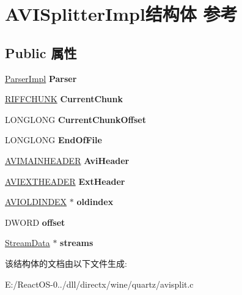 \hypertarget{struct_a_v_i_splitter_impl}{}\section{A\+V\+I\+Splitter\+Impl结构体 参考}
\label{struct_a_v_i_splitter_impl}
\subsection*{Public 属性}
\begin{DoxyCompactItemize}
\item 
\mbox{\label{struct_a_v_i_splitter_impl_aa3b6ea1031540ad750081ae0b09b90b2}} 
\hyperlink{struct_parser_impl}{Parser\+Impl} {\bfseries Parser}
\item 
\mbox{\label{struct_a_v_i_splitter_impl_ad8084f23fe123de1a71cac94f5cab819}} 
\hyperlink{struct__riffchunk}{R\+I\+F\+F\+C\+H\+U\+NK} {\bfseries Current\+Chunk}
\item 
\mbox{\label{struct_a_v_i_splitter_impl_aacb860ceb3227ba58abe3f0c29e6408e}} 
L\+O\+N\+G\+L\+O\+NG {\bfseries Current\+Chunk\+Offset}
\item 
\mbox{\label{struct_a_v_i_splitter_impl_a7548da62793dfd151c9e2f19b0f82760}} 
L\+O\+N\+G\+L\+O\+NG {\bfseries End\+Of\+File}
\item 
\mbox{\label{struct_a_v_i_splitter_impl_a7946f7e1cdebabab5d89bc9ddba5016e}} 
\hyperlink{struct__avimainheader}{A\+V\+I\+M\+A\+I\+N\+H\+E\+A\+D\+ER} {\bfseries Avi\+Header}
\item 
\mbox{\label{struct_a_v_i_splitter_impl_a0e593c99255298d9aac1a09d7e2d3e9b}} 
\hyperlink{struct__aviextheader}{A\+V\+I\+E\+X\+T\+H\+E\+A\+D\+ER} {\bfseries Ext\+Header}
\item 
\mbox{\label{struct_a_v_i_splitter_impl_a71ea84b74a0a266e271740afe229b67a}} 
\hyperlink{struct__avioldindex}{A\+V\+I\+O\+L\+D\+I\+N\+D\+EX} $\ast$ {\bfseries oldindex}
\item 
\mbox{\label{struct_a_v_i_splitter_impl_ac730a23c507822d9b175f1123bbad389}} 
D\+W\+O\+RD {\bfseries offset}
\item 
\mbox{\label{struct_a_v_i_splitter_impl_a52d35b32de72c696aed60a20da9e5f85}} 
\hyperlink{struct_stream_data}{Stream\+Data} $\ast$ {\bfseries streams}
\end{DoxyCompactItemize}


该结构体的文档由以下文件生成\+:\begin{DoxyCompactItemize}
\item 
E\+:/\+React\+O\+S-\/0../dll/directx/wine/quartz/avisplit.\+c\end{DoxyCompactItemize}
